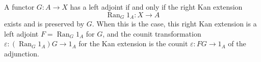 A functor $G: A \to X$ has a left adjoint if and only if the right Kan extension
$$\operatorname{Ran}_G 1_A: X \to A$$
exists and is preserved by $G$. When this is the case, this right Kan extension is a left adjoint $F = \operatorname{Ran}_G 1_A$ for $G$, and the counit transformation $\varepsilon: (\operatorname{Ran}_G 1_A) G \to 1_A$ for the Kan extension is the counit $\varepsilon: FG \to 1_A$ of the adjunction.

